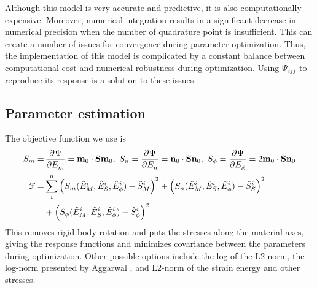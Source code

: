 	Although this model is very accurate and predictive, it is also computationally expensive. Moreover, numerical integration results in a significant decrease in numerical precision when the number of quadrature point is insufficient. This can create a number of issues for convergence during parameter optimization. Thus, the implementation of this model is complicated by a constant balance between computational cost and numerical robustness during optimization. Using $\Psi_{eff}$ to reproduce its response is a solution to these issues. %
    
    
    



	









\subsection{Parameter estimation}

	The objective function we use is 
\begin{equation}\label{eqn:objectivefunction}
\begin{aligned}
S_m =& \dpd{\Psi}{E_m} = \mathbf{m}_0\cdot\mathbf{S}\mathbf{m}_0,
	\  S_n = \dpd{\Psi}{E_n} = \mathbf{n}_0\cdot\mathbf{S}\mathbf{n}_0, 
    \  S_\phi = \dpd{\Psi}{E_\phi} = 2\mathbf{m}_0\cdot\mathbf{S}\mathbf{n}_0 \\
\mathcal{F} =& \sum_i^n \left(S_m(\hat{E}_M^i, \hat{E}_S^i, \hat{E}_\phi^i) - \hat{S}_M^i \right)^2 + \left(S_n(\hat{E}_M^i, \hat{E}_S^i, \hat{E}_\phi^i) - \hat{S}_S^i \right)^2     \\
    &+ \left(S_\phi(\hat{E}_M^i, \hat{E}_S^i, \hat{E}_\phi^i) - \hat{S}_\phi^i \right)^2
\end{aligned}
\end{equation}
    This removes rigid body rotation and puts the stresses along the material axes, giving the response functions and minimizes covariance between the parameters during optimization. Other possible options include the log of the L2-norm, the log-norm presented by Aggarwal \cite{aggarwal_improved_2017}, and L2-norm of the strain energy and other stresses.


